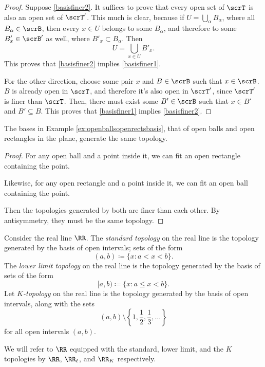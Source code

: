 \documentclass{article}
\begin{document}
\begin{proof}
    Suppose \ref{basisfiner2}.
    It suffices to prove that every open set of $\scrT$ is also an open set of $\scrT'$.
    This much is clear, because if $U = \bigcup_\alpha B_\alpha$, where all $B_\alpha \in \scrB$, then every $x \in U$ belongs to some $B_\alpha$, and therefore to some $B'_x \in \scrB'$ as well, where $B'_x \subset B_\alpha$.
    Then
    \[
        U = \bigcup_{x \in U} B'_x.
    \]
    This proves that \ref{basisfiner2} implies \ref{basisfiner1}.

    For the other direction, choose some pair $x$ and $B \in \scrB$ such that $x \in \scrB$.
    $B$ is already open in $\scrT$, and therefore it's also open in $\scrT'$, since $\scrT'$ is finer than $\scrT$.
    Then, there must exist some $B' \in \scrB$ such that $x \in B'$ and $B' \subseteq B$.
    This proves that \ref{basisfiner1} implies \ref{basisfiner2}.
\end{proof}

\begin{example}
    The bases in Example \ref{ex:openballsopenrectsbasis}, that of open balls and open rectangles in the plane, generate the same topology.
\end{example}

\begin{proof}
    For any open ball and a point inside it, we can fit an open rectangle containing the point.

    Likewise, for any open rectangle and a point inside it, we can fit an open ball containing the point.

    Then the topologies generated by both are finer than each other.
    By antisymmetry, they must be the same topology.
\end{proof}

\begin{definition}
    Consider the real line $\RR$.
    The \textit{standard topology} on the real line is the topology generated by the basis of open intervals; sets of the form
    \[
        (a,b) \coloneq \{x: a < x < b\}.
    \]
    The \textit{lower limit topology} on the real line is the topology generated by the basis of sets of the form
    \[
        [a,b) \coloneq \{x: a \leq x < b\}.
    \]
    Let \textit{$K$-topology} on the real line is the topology generated by the basis of open intervals, along with the sets 
    \[
        (a,b) \setminus \left\{1, \frac{1}{2}, \frac{1}{3}, \ldots\right\}
    \]
    for all open intervals $(a,b)$.

    We will refer to $\RR$ equipped with the standard, lower limit, and the $K$ topologies by $\RR$, $\RR_\ell$, and $\RR_K$ respectively.
\end{definition}
\end{document}
